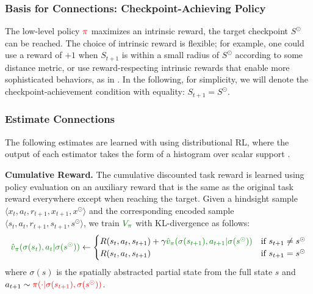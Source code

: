 \subsubsection{Basis for Connections: Checkpoint-Achieving Policy}
The low-level policy $\textcolor{red}{\pi}$ maximizes an intrinsic reward, \st{} the target checkpoint $S^{\odot}$ can be reached. The choice of intrinsic reward is flexible; for example, one could use a reward of $+1$ when $S_{t+1}$ is within a small radius of $S^{\odot}$
according to some distance metric, or use reward-respecting intrinsic rewards that enable more sophisticated behaviors, as in \citep{sutton2022reward}. In the following, for simplicity, we will denote the checkpoint-achievement condition with equality: $S_{t+1}=S^{\odot}$.

\subsubsection{Estimate Connections}
The following estimates are learned with using distributional RL, where the output of each estimator takes the form of a histogram over scalar support \citep{dabney2018distributional}.

\textbf{Cumulative Reward.} %
The cumulative discounted task reward  
is learned using policy evaluation on an auxiliary reward that is the same as the original task reward everywhere except when reaching the target. Given a hindsight sample $\langle x_t, a_t, r_{t+1}, x_{t+1}, x^{\odot} \rangle$ and the corresponding encoded sample $\langle s_t, a_t, r_{t+1}, s_{t+1}, s^{\odot} \rangle$, we train $\darkgreen{V_\pi}$ with KL-divergence as follows:
\vspace*{-2mm}
\begin{equation}
\darkgreen{\hat{v}_\pi(\sigma(s_t), a_t | \sigma(s^{\odot}))} \gets \begin{cases}
R(s_t, a_t, s_{t+1}) + \gamma \darkgreen{\hat{v}_\pi(\sigma(s_{t+1}), a_{t+1} | \sigma(s^{\odot}))} &\text{if } s_{t+1} \neq s^{\odot}\\
R(s_t, a_t, s_{t+1}) &\text{if } s_{t+1} = s^{\odot}
\end{cases}
\vspace*{-2mm}
\label{eq:smdp_reward}
\end{equation}
where $\sigma(s)$ is the spatially abstracted partial state from the full state $s$ and $a_{t+1} \sim \textcolor{red}{\pi(\cdot | \sigma(s_{t+1}), \sigma(s^{\odot}))}$. %

